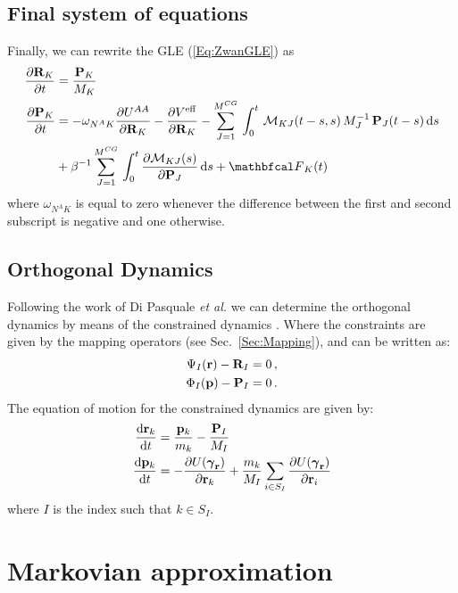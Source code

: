 \documentclass[10pt,a4paper]{book}
\theoremstyle{definition}
\begin{document}
\section{Final system of equations}
Finally, we can rewrite the GLE (\ref{Eq:ZwanGLE}) as 
\begin{align}
 \nonumber
 \pard{\bfR_{K}}{t} &= \frac{\bfP_{K}}{M_{K}} \\
 \nonumber 
 \pard{\bfP_{K}}{t} &= -\omega_{\NA{} K} \pard{\pot^{AA}}{\bfR_{K}} - \pard{\Veff}{\bfR_{K}} 
 - \sum_{J=1}^{\ncg}\,\int_{0}^{t}\,\fricmat_{KJ}(t-s,s)\,M_J^{-1}\,\bfP_J(t-s) \,\diff s \\
 &+ \beta^{-1} \sum_{J=1}^{\ncg} \,\int_{0}^{t} \pard{\fricmat_{KJ}(s)}{\bfP_{J}} \,\diff s + \fprojbf_{K}(t)
 \label{Eq:DevB} 
\end{align}
%
where $\omega_{N^AK}$ is equal to zero whenever the difference between the first and second subscript is negative and one otherwise.


\section{Orthogonal Dynamics}
\label{Sec:OD}
Following the work of Di Pasquale \textit{et al.} we can determine the orthogonal dynamics by means of the constrained dynamics \cite{DiPasquale2019}. Where 
the constraints are given by the mapping operators (see Sec.~\ref{Sec:Mapping}), and can be written as:
%
\begin{align*}
	\Psi_I(\mathbf{r}) - \mathbf{R}_I & = 0\,, \\
	\Phi_I(\mathbf{p}) - \mathbf{P}_I & = 0\,.
\end{align*}
%
The equation of motion for the constrained dynamics are given by:
%
\begin{align}
	\nonumber
	\totd{\bfr_k}{t} &= \frac{\bfp_k}{m_{k}} - \frac{\bfP_I}{M_I} \\
	\label{Eq:orth}
	\totd{\bfp_k}{t} &= - \pard{U(\Aphase{\bfr})}{\bfr_k} + \frac{m_k}{M_I}\sum_{i\in S_I}\pard{U(\Aphase{\bfr})}{\bfr_i}%
\end{align}
%
where $I$ is the index such that $k\in S_I$.

\chapter{Markovian approximation}
\label{Sec:MarkovApprox}
\end{document}
